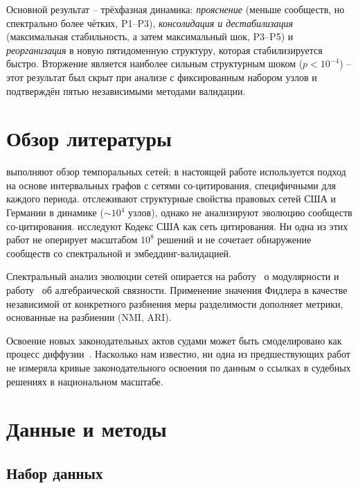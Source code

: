 \documentclass[11pt]{article}
\begin{document}
Основной результат -- трёхфазная динамика: \emph{прояснение} (меньше сообществ, но спектрально более чётких, P1--P3), \emph{консолидация и дестабилизация} (максимальная стабильность, а затем максимальный шок, P3--P5) и \emph{реорганизация} в новую пятидоменную структуру, которая стабилизируется быстро.
Вторжение является наиболее сильным структурным шоком ($p < 10^{-4}$) -- этот результат был скрыт при анализе с фиксированным набором узлов и подтверждён пятью независимыми методами валидации.

\section{Обзор литературы}
\label{sec:related}

\citet{holme2012temporal} выполняют обзор темпоральных сетей; в настоящей работе используется подход на основе интервальных графов с сетями со-цитирования, специфичными для каждого периода.
\citet{coupette2021measuring} отслеживают структурные свойства правовых сетей США и Германии в динамике (${\sim}10^4$ узлов), однако не анализируют эволюцию сообществ со-цитирования.
\citet{bommarito2010mathematical} исследуют Кодекс США как сеть цитирования.
Ни одна из этих работ не оперирует масштабом $10^8$ решений и не сочетает обнаружение сообществ со спектральной и эмбеддинг-валидацией.

Спектральный анализ эволюции сетей опирается на работу~\citet{newman2004finding} о модулярности и работу~\citet{fiedler1973algebraic} об алгебраической связности.
Применение значения Фидлера в качестве независимой от конкретного разбиения меры разделимости дополняет метрики, основанные на разбиении (NMI, ARI).

Освоение новых законодательных актов судами может быть смоделировано как процесс диффузии~\citep{rogers1962diffusion}.
Насколько нам известно, ни одна из предшествующих работ не измеряла кривые законодательного освоения по данным о ссылках в судебных решениях в национальном масштабе.



\section{Данные и методы}
\label{sec:methods}

\subsection{Набор данных}
\end{document}
